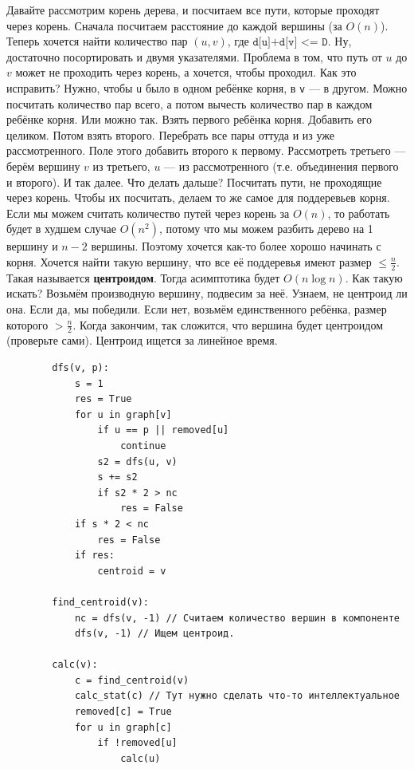 \documentclass{article}
\newcommand{\pseudo}{PseudoLexer.py:PseudoLexer -x}
\newcommand{\pseudocode}[1]{\texttt{#1}}
\begin{document}
    Давайте рассмотрим корень дерева, и посчитаем все пути, которые проходят через корень. Сначала посчитаем расстояние до каждой вершины (за $O(n)$). Теперь хочется найти количество пар $(u,v)$, где $\pseudocode{d[u]+d[v] <= D}$. Ну, достаточно посортировать и двумя указателями. Проблема в том, что путь от $u$ до $v$ может не проходить через корень, а хочется, чтобы проходил. Как это исправить? Нужно, чтобы \pseudocode{u} было в одном ребёнке корня, в \pseudocode{v} --- в другом. Можно посчитать количество пар всего, а потом вычесть количество пар в каждом ребёнке корня. Или можно так. Взять первого ребёнка корня. Добавить его целиком. Потом взять второго. Перебрать все пары оттуда и из уже рассмотренного. Поле этого добавить второго к первому. Рассмотреть третьего --- берём вершину $v$ из третьего, $u$ --- из рассмотренного (т.е. объединения первого и второго). И так далее. Что делать дальше? Посчитать пути, не проходящие через корень. Чтобы их посчитать, делаем то же самое для поддеревьев корня. Если мы можем считать количество путей через корень за $O(n)$, то работать будет в худшем случае $O(n^2)$, потому что мы можем разбить дерево на 1 вершину и $n-2$ вершины. Поэтому хочется как-то более хорошо начинать с корня. Хочется найти такую вершину, что все её поддеревья имеют размер $\leqslant\frac n2$. Такая называется \textbf{центроидом}. Тогда асимптотика будет $O(n\log n)$. Как такую искать? Возьмём производную вершину, подвесим за неё. Узнаем, не центроид ли она. Если да, мы победили. Если нет, возьмём единственного ребёнка, размер которого $>\frac n2$. Когда закончим, так сложится, что вершина будет центроидом (проверьте сами). Центроид ищется за линейное время.
    \begin{verbatim}
        dfs(v, p):
            s = 1
            res = True
            for u in graph[v]
                if u == p || removed[u]
                    continue
                s2 = dfs(u, v)
                s += s2
                if s2 * 2 > nc
                    res = False
            if s * 2 < nc
                res = False
            if res:
                centroid = v

        find_centroid(v):
            nc = dfs(v, -1) // Считаем количество вершин в компоненте
            dfs(v, -1) // Ищем центроид.

        calc(v):
            c = find_centroid(v)
            calc_stat(c) // Тут нужно сделать что-то интеллектуальное
            removed[c] = True
            for u in graph[c]
                if !removed[u]
                    calc(u)
    \end{verbatim}
\end{document}

